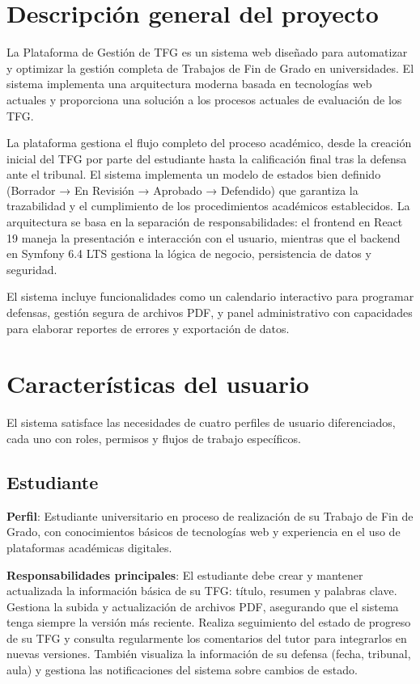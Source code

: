 \documentclass[12pt,a4paper,oneside]{report}
\begin{document}
\section{Descripción general del
proyecto}\label{descripciuxf3n-general-del-proyecto}

La Plataforma de Gestión de TFG es un sistema web diseñado para automatizar y optimizar la gestión completa de Trabajos de Fin de Grado en universidades. El sistema implementa una arquitectura moderna basada en tecnologías web actuales y proporciona una solución a los procesos actuales de evaluación de los TFG.

La plataforma gestiona el flujo completo del proceso académico, desde la
creación inicial del TFG por parte del estudiante hasta la calificación
final tras la defensa ante el tribunal. El sistema implementa un modelo
de estados bien definido (Borrador → En Revisión → Aprobado → Defendido)
que garantiza la trazabilidad y el cumplimiento de los procedimientos
académicos establecidos.
La arquitectura se basa en la separación de responsabilidades: el frontend en React 19 maneja la presentación e interacción con el usuario, mientras que el backend en Symfony 6.4 LTS gestiona la lógica de negocio, persistencia de datos y seguridad.

El sistema incluye funcionalidades como un calendario interactivo para programar defensas, gestión segura de archivos PDF, y panel administrativo con capacidades para elaborar reportes de errores y exportación de datos.

\section{Características del
usuario}\label{caracteruxedsticas-del-usuario}

El sistema satisface las necesidades de cuatro perfiles de usuario diferenciados, cada uno con roles, permisos y flujos de trabajo específicos.

\subsection{Estudiante}\label{estudiante}

\textbf{Perfil}: Estudiante universitario en proceso de realización de
su Trabajo de Fin de Grado, con conocimientos básicos de tecnologías web
y experiencia en el uso de plataformas académicas digitales.

\textbf{Responsabilidades principales}: El estudiante debe crear y mantener actualizada la información básica de su TFG: título, resumen y palabras clave. Gestiona la subida y actualización de archivos PDF, asegurando que el sistema tenga siempre la versión más reciente. Realiza seguimiento del estado de progreso de su TFG y consulta regularmente los comentarios del tutor para integrarlos en nuevas versiones. También visualiza la información de su defensa (fecha, tribunal, aula) y gestiona las notificaciones del sistema sobre cambios de estado.
\end{document}
